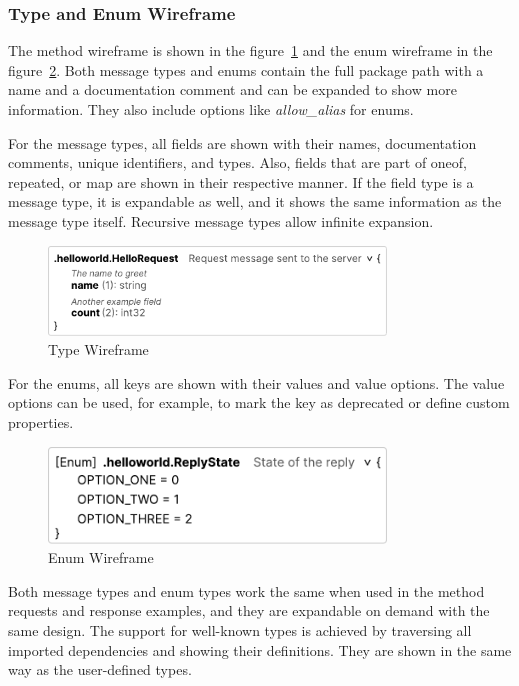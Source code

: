 \subsubsection{Type and Enum Wireframe}
The method wireframe is shown in the figure~\ref{fig:wireframe-type} and the enum wireframe in the figure~\ref{fig:wireframe-enum}.
Both message types and enums contain the full package path with a name and a documentation comment and can be expanded to show more information.
They also include options like \textit{allow\_alias} for enums.

For the message types, all fields are shown with their names, documentation comments, unique identifiers, and types.
Also, fields that are part of oneof, repeated, or map are shown in their respective manner.
If the field type is a message type, it is expandable as well, and it shows the same information as the message type itself.
Recursive message types allow infinite expansion.

\begin{figure}[hbt!]
    \centering
    \captionsetup{justification=centering}
    \includegraphics[width=0.8\textwidth]{images/design/wireframes/type}
    \caption{Type Wireframe}
    \label{fig:wireframe-type}
\end{figure}


For the enums, all keys are shown with their values and value options.
The value options can be used, for example, to mark the key as deprecated or define custom properties.

\begin{figure}[hbt!]
    \centering
    \captionsetup{justification=centering}
    \includegraphics[width=0.8\textwidth]{images/design/wireframes/enum}
    \caption{Enum Wireframe}
    \label{fig:wireframe-enum}
\end{figure}

Both message types and enum types work the same when used in the method requests and response examples, and they are expandable on demand with the same design.
The support for well-known types is achieved by traversing all imported dependencies and showing their definitions.
They are shown in the same way as the user-defined types.


